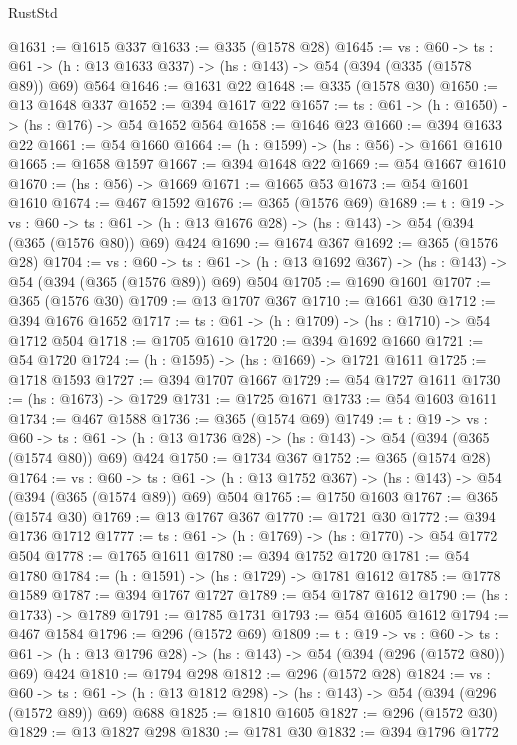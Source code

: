 \begin{lexlean}{RustStd}
\begin{coremodule}
{\begin{coremodule}
{{{{{{{{@1631 := @1615 @337
@1633 := @335 (@1578 @28)
@1645 := {vs : @60} ->
  {ts : @61} -> (h : @13 @1633 @337) -> (hs : @143) -> @54 (@394 (@335 (@1578 @89)) @69) @564
@1646 := @1631 @22
@1648 := @335 (@1578 @30)
@1650 := @13 @1648 @337
@1652 := @394 @1617 @22
@1657 := {ts : @61} -> (h : @1650) -> (hs : @176) -> @54 @1652 @564
@1658 := @1646 @23
@1660 := @394 @1633 @22
@1661 := @54 @1660
@1664 := (h : @1599) -> (hs : @56) -> @1661 @1610
@1665 := @1658 @1597
@1667 := @394 @1648 @22
@1669 := @54 @1667 @1610
@1670 := (hs : @56) -> @1669
@1671 := @1665 @53
@1673 := @54 @1601 @1610
@1674 := @467 @1592
@1676 := @365 (@1576 @69)
@1689 := {t : @19} ->
  {vs : @60} ->
  {ts : @61} -> (h : @13 @1676 @28) -> (hs : @143) -> @54 (@394 (@365 (@1576 @80)) @69) @424
@1690 := @1674 @367
@1692 := @365 (@1576 @28)
@1704 := {vs : @60} ->
  {ts : @61} -> (h : @13 @1692 @367) -> (hs : @143) -> @54 (@394 (@365 (@1576 @89)) @69) @504
@1705 := @1690 @1601
@1707 := @365 (@1576 @30)
@1709 := @13 @1707 @367
@1710 := @1661 @30
@1712 := @394 @1676 @1652
@1717 := {ts : @61} -> (h : @1709) -> (hs : @1710) -> @54 @1712 @504
@1718 := @1705 @1610
@1720 := @394 @1692 @1660
@1721 := @54 @1720
@1724 := (h : @1595) -> (hs : @1669) -> @1721 @1611
@1725 := @1718 @1593
@1727 := @394 @1707 @1667
@1729 := @54 @1727 @1611
@1730 := (hs : @1673) -> @1729
@1731 := @1725 @1671
@1733 := @54 @1603 @1611
@1734 := @467 @1588
@1736 := @365 (@1574 @69)
@1749 := {t : @19} ->
  {vs : @60} ->
  {ts : @61} -> (h : @13 @1736 @28) -> (hs : @143) -> @54 (@394 (@365 (@1574 @80)) @69) @424
@1750 := @1734 @367
@1752 := @365 (@1574 @28)
@1764 := {vs : @60} ->
  {ts : @61} -> (h : @13 @1752 @367) -> (hs : @143) -> @54 (@394 (@365 (@1574 @89)) @69) @504
@1765 := @1750 @1603
@1767 := @365 (@1574 @30)
@1769 := @13 @1767 @367
@1770 := @1721 @30
@1772 := @394 @1736 @1712
@1777 := {ts : @61} -> (h : @1769) -> (hs : @1770) -> @54 @1772 @504
@1778 := @1765 @1611
@1780 := @394 @1752 @1720
@1781 := @54 @1780
@1784 := (h : @1591) -> (hs : @1729) -> @1781 @1612
@1785 := @1778 @1589
@1787 := @394 @1767 @1727
@1789 := @54 @1787 @1612
@1790 := (hs : @1733) -> @1789
@1791 := @1785 @1731
@1793 := @54 @1605 @1612
@1794 := @467 @1584
@1796 := @296 (@1572 @69)
@1809 := {t : @19} ->
  {vs : @60} ->
  {ts : @61} -> (h : @13 @1796 @28) -> (hs : @143) -> @54 (@394 (@296 (@1572 @80)) @69) @424
@1810 := @1794 @298
@1812 := @296 (@1572 @28)
@1824 := {vs : @60} ->
  {ts : @61} -> (h : @13 @1812 @298) -> (hs : @143) -> @54 (@394 (@296 (@1572 @89)) @69) @688
@1825 := @1810 @1605
@1827 := @296 (@1572 @30)
@1829 := @13 @1827 @298
@1830 := @1781 @30
@1832 := @394 @1796 @1772
}}}}}}}}
\end{coremodule}}
\end{coremodule}
\end{lexlean}
